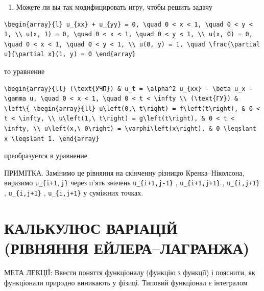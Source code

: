 \documentclass[
  ukrainian,
]{article}
\providecommand{\tightlist}{%
  \setlength{\itemsep}{0pt}\setlength{\parskip}{0pt}}
\begin{document}
\begin{enumerate}
\def\labelenumi{\arabic{enumi}.}
\setcounter{enumi}{3}
\tightlist
\item
  Можете ли вы так модифицировать игру, чтобы решить задачу
\end{enumerate}

\begin{verbatim}
\begin{array}{l} u_{xx} + u_{yy} = 0, \quad 0 < x < 1, \quad 0 < y < 1, \\ u(x, 1) = 0, \quad 0 < x < 1, \quad 0 < y < 1, \\ u(x, 0) = 0, \quad 0 < x < 1, \quad 0 < y < 1, \\ u(0, y) = 1, \quad \frac{\partial u}{\partial x}(1, y) = 0 \end{array}
\end{verbatim}

то уравнение

\begin{verbatim}
\begin{array}{ll} (\text{УЧП}) & u_t = \alpha^2 u_{xx} - \beta u_x - \gamma u, \quad 0 < x < 1, \quad 0 < t < \infty \\ (\text{ГУ}) & \left\{ \begin{array}{ll} u\left(0,\ t\right) = f\left(t\right), & 0 < t < \infty, \\ u\left(1,\ t\right) = g\left(t\right), & 0 < t < \infty, \\ u\left(x,\ 0\right) = \varphi\left(x\right), & 0 \leqslant x \leqslant 1. \end{array}
\end{verbatim}

преобразуется в уравнение

ПРИМІТКА. Замінимо це рівняння на скінченну різницю Кренка--Ніколсона,
виразимо \texttt{u\_\{i+1,j\}} через п'ять значень
\texttt{u\_\{i+1,j-1\}} , \texttt{u\_\{i+1,j+1\}} ,
\texttt{u\_\{i,j+1\}} , \texttt{u\_\{i,j+1\}} , \texttt{u\_\{i,j+1\}} у
суміжних точках.

\section{КАЛЬКУЛЮС ВАРІАЦІЙ (РІВНЯННЯ
ЕЙЛЕРА--ЛАГРАНЖА)}\label{ux43aux430ux43bux44cux43aux443ux43bux44eux441-ux432ux430ux440ux456ux430ux446ux456ux439-ux440ux456ux432ux43dux44fux43dux43dux44f-ux435ux439ux43bux435ux440ux430ux43bux430ux433ux440ux430ux43dux436ux430}

МЕТА ЛЕКЦІЇ: Ввести поняття функціоналу (функцію з функції) і пояснити,
як функціонали природно виникають у фізиці. Типовий функціонал є
інтегралом
\end{document}
